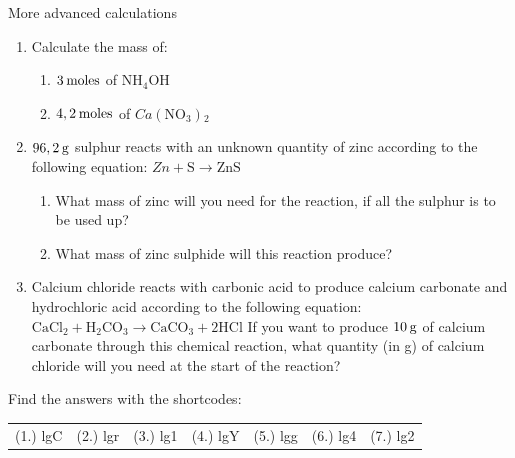 \begin{exercises}{  More advanced calculations
      }
\begin{enumerate}[noitemsep, label=\textbf{\arabic*}. ]
\begin{enumerate}[noitemsep, label=\textbf{\alph*}. ]
\end{enumerate}
                \label{m38717*uid61}\item Calculate the mass of:
\label{m38717*id280072}\begin{enumerate}[noitemsep, label=\textbf{\alph*}. ] 
            \label{m38717*uid62}\item $3\phantom{\rule{2pt}{0ex}}\mathrm{moles}$ of $\mathrm{NH}{}_{4}\mathrm{OH}$
\label{m38717*uid63}\item $4,2\phantom{\rule{2pt}{0ex}}\mathrm{moles}$ of $Ca\left(\mathrm{NO}{}_{3}\right){}_{2}$\end{enumerate}
                \label{m38717*uid64}\item $96,2\phantom{\rule{2pt}{0ex}}\mathrm{g}$ sulphur reacts with an unknown quantity of zinc according to the following equation:
$Zn+\mathrm{S}\to \mathrm{ZnS}$\label{m38717*id280179}\begin{enumerate}[noitemsep, label=\textbf{\alph*}. ] 
            \label{m38717*uid65}\item What mass of zinc will you need for the reaction, if all the sulphur is to be used up?
\label{m38717*uid66}\item What mass of zinc sulphide will this reaction produce?
\end{enumerate}
                \label{m38717*uid67}\item Calcium chloride reacts with carbonic acid to produce calcium carbonate and hydrochloric acid according to the following equation:
${\mathrm{CaCl}}_{2}+{\mathrm{H}}_{2}{\mathrm{CO}}_{3}\to {\mathrm{CaCO}}_{3}+2\mathrm{HCl}$
If you want to produce $10\phantom{\rule{2pt}{0ex}}\mathrm{g}$ of calcium carbonate through this chemical reaction, what quantity (in g) of calcium chloride will you need at the start of the reaction?\newline
\end{enumerate}
  \label{m38717**end}
\par {} Find the answers with the shortcodes:
 \par \begin{tabular}[h]{cccccc}
 (1.) lgC  &  (2.) lgr  &  (3.) lg1  &  (4.) lgY  &  (5.) lgg  &  (6.) lg4  &  (7.) lg2  & \end{tabular}
\end{exercises}
